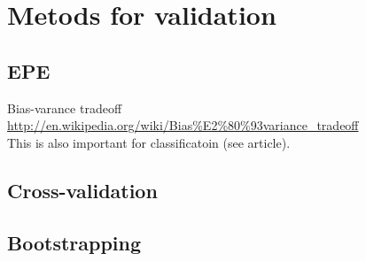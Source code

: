 \section{Metods for validation}
\label{sec:Metods for validation}
\subsection{EPE}
\label{sub:EPE}
Bias-varance tradeoff \url{http://en.wikipedia.org/wiki/Bias%E2%80%93variance_tradeoff} \\
This is also important for classificatoin (see article).

\subsection{Cross-validation}
\label{sub:Cross-validation}

\subsection{Bootstrapping}
\label{sub:Bootstrapping}

